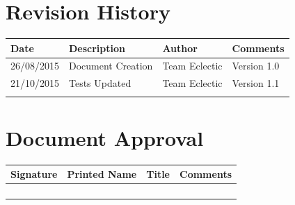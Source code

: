 \documentclass[11pt]{article}
\begin{document}


\setcounter{tocdepth}{3}
\setcounter{secnumdepth}{5}
\tableofcontents

\newpage
\section{Revision History}
\begin{table}[h]
\begin{tabular}{llll}
\textbf{Date}          & \textbf{Description}  & \textbf{Author}       & \textbf{Comments}   \\ \hline
\multicolumn{1}{|R{2cm}|}{26/08/2015} & \multicolumn{1}{L{4.5cm}|}{Document Creation} & \multicolumn{1}{l|}{Team Eclectic} & \multicolumn{1}{L{4cm}|}{Version 1.0} \\ \hline
\multicolumn{1}{|R{2cm}|}{21/10/2015} & \multicolumn{1}{L{4.5cm}|}{Tests Updated} & \multicolumn{1}{l|}{Team Eclectic} & \multicolumn{1}{L{4cm}|}{Version 1.1} \\ \hline
\multicolumn{1}{|l|}{} & \multicolumn{1}{l|}{} & \multicolumn{1}{l|}{} & \multicolumn{1}{l|}{} \\ \hline

\end{tabular}
\end{table}

\section{Document Approval}
\begin{table}[h]
\begin{tabular}{llll}
\textbf{Signature}     & \textbf{Printed Name} & \textbf{Title}        & \textbf{Comments}     \\ \hline
\multicolumn{1}{|l|}{} & \multicolumn{1}{L{3.5cm}|}{} & \multicolumn{1}{L{3.5cm}|}{} & \multicolumn{1}{L{4cm}|}{} \\ \hline
\multicolumn{1}{|l|}{} & \multicolumn{1}{l|}{} & \multicolumn{1}{l|}{} & \multicolumn{1}{l|}{} \\ \hline
\multicolumn{1}{|l|}{} & \multicolumn{1}{l|}{} & \multicolumn{1}{l|}{} & \multicolumn{1}{l|}{} \\ \hline
\multicolumn{1}{|l|}{} & \multicolumn{1}{l|}{} & \multicolumn{1}{l|}{} & \multicolumn{1}{l|}{} \\ \hline
\end{tabular}
\end{table}

\newpage
\end{document}
